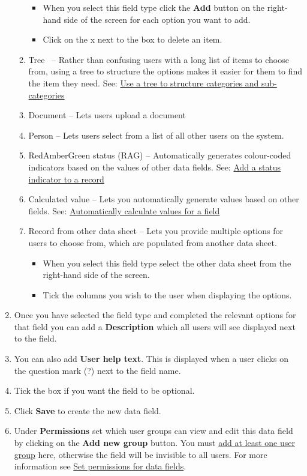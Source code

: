 \documentclass{ctrlo-int-toc}
\begin{document}
\begin{admin}
\begin{enumerate}
\begin{enumerate}
\begin{itemize}
    \item When you select this field type click the \textbf{Add} button on the right-hand side of the screen for each option you want to add.
\item Click on the x next to the box to delete an item. 
\end{itemize}
\item Tree \ {}-- Rather than confusing users with a long list of items to choose from, using a tree to structure the options makes it easier for them to find the item they need. See: \hyperref[subsec:fieldtree]{Use a tree to structure categories and sub-categories}
\item Document {}-- Lets users upload a document
\item Person {}-- Lets users select from a list of all other users on the system.
\item RedAmberGreen status (RAG) \--- Automatically generates colour-coded indicators based on the values of other data fields. See: \hyperref[subsec:fieldrag]{Add a status indicator to a record}
\item Calculated value {}-- Lets you automatically generate values based on other fields. See: \hyperref[subsec:fieldcalc]{Automatically calculate values for a field}
\item Record from other data sheet -- Lets you provide multiple options for users to choose from, which are populated from another data sheet.

\begin{itemize}
    \item When you select this field type select the other data sheet from the right-hand side of the screen.
    \item Tick the columns you wish to the user when displaying the options.
\end{itemize}
\end{enumerate}
\item Once you have selected the field type and completed the relevant options for that field you can add a \textbf{Description} which all users will see displayed next to the field. 
\item You can also add \textbf{User help text}. This is displayed when a user clicks on the question mark (?) next to the field name. 
\item Tick the box if you want the field to be optional.
\item Click \textbf{Save} to create the new data field. 
\item Under \textbf{Permissions} set which user groups can view and edit this data field by clicking on the \textbf{Add new group} button. You must \hyperref[sec:usergroups]{add at least one user group} here, otherwise the field will be invisible to all users. For more information see \hyperref[subsec:setfieldperms]{Set permissions for data fields}.
\end{enumerate}


\end{admin}
\end{document}
